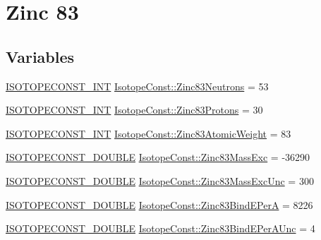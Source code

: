 \hypertarget{group___isotope_const-_zinc-_zn83}{}\section{Zinc 83}
\label{group___isotope_const-_zinc-_zn83}
\subsection*{Variables}
\begin{DoxyCompactItemize}
\item 
\mbox{\hyperlink{group___isotope_const-_macros_ga5f18360b3e99483a35c32d789e62621c}{I\+S\+O\+T\+O\+P\+E\+C\+O\+N\+S\+T\+\_\+\+I\+NT}} \mbox{\hyperlink{group___isotope_const-_zinc-_zn83_gada906cc4fff4a16ff703a596c58d2f37}{Isotope\+Const\+::\+Zinc83\+Neutrons}} = 53
\item 
\mbox{\hyperlink{group___isotope_const-_macros_ga5f18360b3e99483a35c32d789e62621c}{I\+S\+O\+T\+O\+P\+E\+C\+O\+N\+S\+T\+\_\+\+I\+NT}} \mbox{\hyperlink{group___isotope_const-_zinc-_zn83_ga8aac5c2de200ed531968e372f07abc7b}{Isotope\+Const\+::\+Zinc83\+Protons}} = 30
\item 
\mbox{\hyperlink{group___isotope_const-_macros_ga5f18360b3e99483a35c32d789e62621c}{I\+S\+O\+T\+O\+P\+E\+C\+O\+N\+S\+T\+\_\+\+I\+NT}} \mbox{\hyperlink{group___isotope_const-_zinc-_zn83_gae5f1b0f3eed0ad47084f6809f47c3b41}{Isotope\+Const\+::\+Zinc83\+Atomic\+Weight}} = 83
\item 
\mbox{\hyperlink{group___isotope_const-_macros_ga8f45a7272ce02c0b4c65c44636ed719a}{I\+S\+O\+T\+O\+P\+E\+C\+O\+N\+S\+T\+\_\+\+D\+O\+U\+B\+LE}} \mbox{\hyperlink{group___isotope_const-_zinc-_zn83_ga86cc45faef6a5d035f3671b71a95e87b}{Isotope\+Const\+::\+Zinc83\+Mass\+Exc}} = -\/36290
\item 
\mbox{\hyperlink{group___isotope_const-_macros_ga8f45a7272ce02c0b4c65c44636ed719a}{I\+S\+O\+T\+O\+P\+E\+C\+O\+N\+S\+T\+\_\+\+D\+O\+U\+B\+LE}} \mbox{\hyperlink{group___isotope_const-_zinc-_zn83_gaeaf2bfba342296facd06fc22565918cf}{Isotope\+Const\+::\+Zinc83\+Mass\+Exc\+Unc}} = 300
\item 
\mbox{\hyperlink{group___isotope_const-_macros_ga8f45a7272ce02c0b4c65c44636ed719a}{I\+S\+O\+T\+O\+P\+E\+C\+O\+N\+S\+T\+\_\+\+D\+O\+U\+B\+LE}} \mbox{\hyperlink{group___isotope_const-_zinc-_zn83_ga95eb83e77d84d9a9df90d3df9ec6aead}{Isotope\+Const\+::\+Zinc83\+Bind\+E\+PerA}} = 8226
\item 
\mbox{\hyperlink{group___isotope_const-_macros_ga8f45a7272ce02c0b4c65c44636ed719a}{I\+S\+O\+T\+O\+P\+E\+C\+O\+N\+S\+T\+\_\+\+D\+O\+U\+B\+LE}} \mbox{\hyperlink{group___isotope_const-_zinc-_zn83_ga09b1b0e6e8d05089570873f835684333}{Isotope\+Const\+::\+Zinc83\+Bind\+E\+Per\+A\+Unc}} = 4

\end{DoxyCompactItemize}
